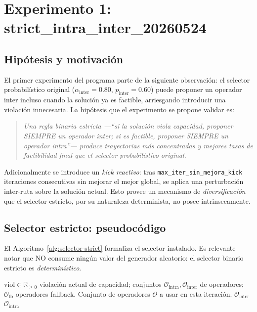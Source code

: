 \documentclass[11pt,a4paper]{article}
\theoremstyle{definition}
\theoremstyle{remark}
\newcommand{\viol}{\text{viol}}
\begin{document}
\section{Experimento 1: strict\_intra\_inter\_20260524}
\label{sec:exp-strict}

\subsection{Hipótesis y motivación}

El primer experimento del programa parte de la siguiente observación:
el selector probabilístico original
($\alpha_{\text{inter}} = 0.80$, $p_{\text{inter}} = 0.60$) puede
proponer un operador inter incluso cuando la solución ya es factible,
arriesgando introducir una violación innecesaria. La hipótesis que el
experimento se propone validar es:

\begin{quote}
\textit{Una regla \emph{binaria estricta} ---``si la solución viola
capacidad, proponer SIEMPRE un operador inter; si es factible, proponer
SIEMPRE un operador intra''--- produce trayectorias más concentradas y
mejores tasas de factibilidad final que el selector probabilístico
original.}
\end{quote}

Adicionalmente se introduce un \emph{kick reactivo}: tras
\texttt{max\_iter\_sin\_mejora\_kick} iteraciones consecutivas sin
mejorar el mejor global, se aplica una perturbación inter-ruta sobre
la solución actual. Esto provee un mecanismo de \emph{diversificación}
que el selector estricto, por su naturaleza determinista, no posee
intrinsecamente.

\subsection{Selector estricto: pseudocódigo}

El Algoritmo~\ref{alg:selector-strict} formaliza el selector instalado.
Es relevante notar que NO consume ningún valor del generador
aleatorio: el selector binario estricto es \emph{determinístico}.

\begin{algorithm}[h]
\caption{Selector binario estricto.}
\label{alg:selector-strict}
\begin{algorithmic}[1]
\Require $\viol \in \mathbb{R}_{\ge 0}$ violación actual de capacidad;
  conjuntos $\mathcal{O}_{\text{intra}}, \mathcal{O}_{\text{inter}}$ de operadores;
  $\mathcal{O}_{\text{fb}}$ operadores fallback.
\Ensure Conjunto de operadores $\mathcal{O}$ a usar en esta iteración.
\If{$\viol > 0$} 
  \State \Return $\mathcal{O}_{\text{inter}}$
\Else
  \State \Return $\mathcal{O}_{\text{intra}}$
\EndIf
\end{algorithmic}
\end{algorithm}
\end{document}

